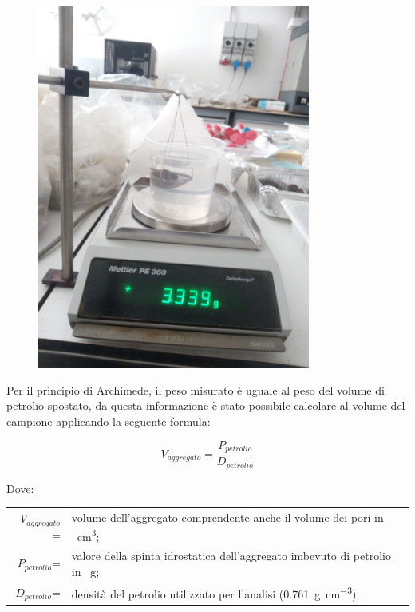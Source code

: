 \documentclass[11pt, a4paper, openright, titlepage, final, language = italian]{book}
\begin{document}
\begin{figure}[ht]
  \centering
  \includegraphics[width=0.8\textwidth]{../foto/navicella.jpeg}
  \caption{\label{fig:bilancia}}
\end{figure}

Per il principio di Archimede, il peso misurato \`e uguale al peso del
volume di petrolio spostato, da questa informazione \`e stato
possibile calcolare al volume del campione applicando la seguente
formula:

\begin{equation}
  \label{eq:VolumeAggr}
  V_{aggregato}=\frac{P_{petrolio}}{D_{petrolio}}
\end{equation} 

Dove:\\
\begin{tabular}{rp{12cm}}
  $V_{aggregato}$= & volume dell'aggregato comprendente anche il
                    volume dei pori in \SI{}{\cubic\cm};\\
  $P_{petrolio}$=  &  valore della spinta idrostatica
                   dell'aggregato imbevuto di petrolio in \SI{}{\gram};\\
  $D_{petrolio}$=  &  densit\`a del petrolio utilizzato per
                  l'analisi (\SI{0.761}{\gram\per\cubic\cm}).
\end{tabular}
\end{document}
